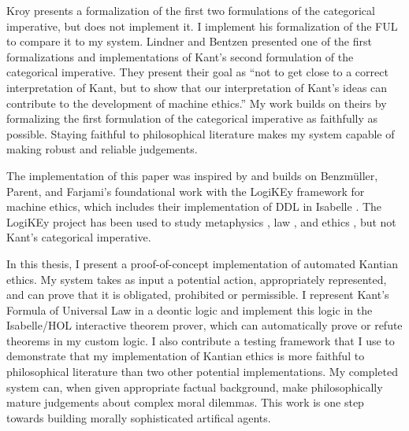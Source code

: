 \begin{isabellebody}
\begin{isamarkuptext}
Kroy \citep{kroy} presents a formalization of the first two formulations of the categorical imperative, 
but does not implement it. I implement his formalization of the FUL to compare it to my system. 
Lindner and Bentzen \citep{BL} presented one of the first formalizations and implementations of 
Kant's second formulation of the categorical imperative. They present their goal as ``not to get 
close to a correct interpretation of Kant, but to show that our interpretation of Kant’s ideas can 
contribute to the development of machine ethics.'' My work builds on theirs by formalizing the 
first formulation of the categorical imperative as faithfully as possible. Staying faithful to 
philosophical literature makes my system capable of making robust and reliable judgements. 

The implementation of this paper was inspired by and builds on Benzmüller, Parent, and Farjami's 
foundational work with the LogiKEy framework for machine ethics, which includes their implementation 
of DDL in Isabelle \citep{BFP, logikey}. The LogiKEy project has been used to study metaphysics 
\citep{godel, metaphysics1}, law \citep{constitution}, and ethics \citep{gewirth}, but not 
Kant's categorical imperative.%
\end{isamarkuptext}\isamarkuptrue%
%
\isadelimdocument
%
\endisadelimdocument
%
\isatagdocument
%
\isamarkuptrue%
%
\endisatagdocument
{\isafolddocument}%
%
\isadelimdocument
%
\endisadelimdocument
%
\begin{isamarkuptext}%
In this thesis, I present a proof-of-concept implementation of automated Kantian ethics. My system
takes as input a potential action, appropriately represented, and can prove that it is obligated, 
prohibited or permissible. I represent Kant's Formula of Universal Law in a deontic logic and 
implement this logic in the Isabelle/HOL interactive theorem prover, which can automatically prove or 
refute theorems in my custom logic. I also contribute a testing framework that I use to demonstrate that
my implementation of Kantian ethics is more faithful to philosophical literature than two other 
potential implementations. My completed system can, when given appropriate factual background, make
philosophically mature judgements about complex moral dilemmas. This work is one step towards building 
morally sophisticated artifical agents.


\end{isamarkuptext}
\end{isabellebody}
